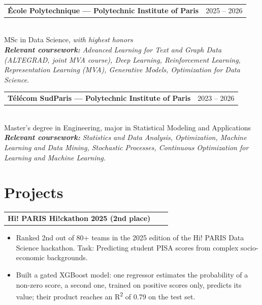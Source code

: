\documentclass[a4paper,10pt]{article}
\makeatletter
\newenvironment{project}[2]
    {
    \begin{tabularx}{\linewidth}{@{}l X r@{}}
    \textbf{#1} & \hfill & #2
    \end{tabularx}
    \begin{minipage}[t]{\linewidth}
    \begin{itemize}[nosep,after=\strut, leftmargin=1em, itemsep=0pt,label=--]
    }
    {
    \end{itemize}
    \end{minipage}
    }
\makeatother
\begin{document}
\begin{tabularx}{\linewidth}{@{}X r@{}}
\textbf{École Polytechnique --- Polytechnic Institute of Paris} & 2025 -- 2026\\
\end{tabularx} \\
MSc in Data Science, \textit{with highest honors}\\[1pt]
\textit{\textbf{Relevant coursework:} Advanced Learning for Text and Graph Data (ALTEGRAD, joint MVA course), Deep Learning, Reinforcement Learning, Representation Learning (MVA), Generative Models, Optimization for Data Science.} \\[6pt]
\begin{tabularx}{\linewidth}{@{}X r@{}}
\textbf{Télécom SudParis --- Polytechnic Institute of Paris} & 2023 -- 2026\\
\end{tabularx}\\
Master's degree in Engineering, major in Statistical Modeling and Applications\\[1pt]
\textit{\textbf{Relevant coursework:} Statistics and Data Analysis, Optimization, Machine Learning and Data Mining, Stochastic Processes, Continuous Optimization for Learning and Machine Learning.}\\[-12pt]

\section{Projects}

\begin{project}{Hi! PARIS Hi!ckathon 2025 (2nd place)}
{\href{https://github.com/maxencedbe/hi_paris_2025}{\textcolor{black}{\raisebox{-0.05\height}{\large \faGithub}}}}
    \item Ranked 2nd out of 80+ teams in the 2025 edition of the Hi! PARIS Data Science hackathon. Task: Predicting student PISA scores from complex socio-economic backgrounds.
    \item Built a gated XGBoost model: one regressor estimates the probability of a non-zero score, a second one, trained on positive scores only, predicts its value; their product reaches an R\textsuperscript{2} of 0.79 on the test set.
\end{project}\vspace{-6pt}
\end{document}
